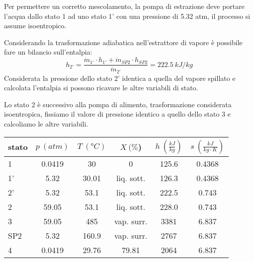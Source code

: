 Per permettere un corretto mescolamento, la pompa di estrazione deve portare l'acqua dallo stato 1 ad uno stato 1' con una pressione di 5.32 atm, il processo si assume
isoentropico.

Considerando la trasformazione adiabatica nell'estrattore di vapore è possibile fare un bilancio sull'entalpia:
\begin{equation*}
    h_{2'} = \frac{\dot m_{1'}\cdot h_{1'} + \dot m_{SP2} \cdot h_{SP2}}{\dot m_{2'}} = 222.5\ kJ/kg
\end{equation*}
Considerata la pressione dello stato 2' identica a quella del vapore spillato e calcolata l'entalpia si possono ricavare le altre variabili di stato.

Lo stato 2 è successivo alla pompa di alimento, trasformazione considerata isoentropica, fissiamo il valore di pressione identico a quello dello stato 3 e calcoliamo
le altre variabili.
\begin{center}
    \begin{tabular}{l|c|c|c|c|c}
        stato    & $p\ (atm)$ & $T\ (\text{°}C) $&$X\ (\%$)& $h\ (\frac{kJ}{kg})$  & $s\ (\frac{kJ}{kg\cdot K})$\\ \hline
        1   &        0.0419 &            30   &    0      & 125.6    &0.4368 \\ \hline
        1'  &        5.32    &           30.01   &liq. sott.  & 126.3&0.4368 \\ \hline
        2'   &       5.32    &           53.1&liq. sott.& 222.5    &0.743 \\ \hline
        2   &        59.05   &           53.1&liq. sott.&  228.0   &0.743   \\ \hline
        3   &        59.05   &           485  & vap. surr.& 3381     &6.837  \\ \hline
        SP2  &       5.32        &       160.9 &  vap. surr.&2767     &6.837  \\ \hline
        4   &        0.0419       &      29.76&     79.81 & 2064     &6.837
    \end{tabular}
\end{center}



